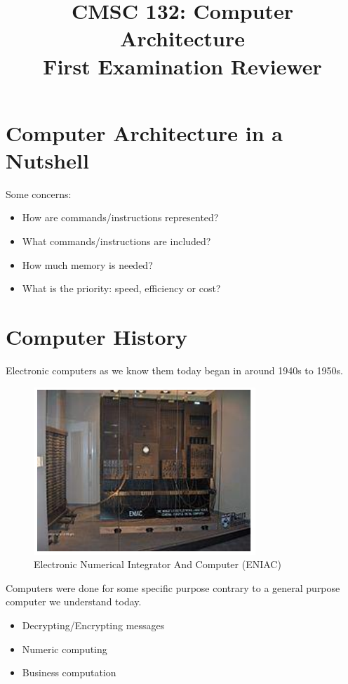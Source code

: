 \documentclass[9pt,twocolumn]{article}
\title{
  \textbf{CMSC 132: Computer Architecture} \\
  First Examination Reviewer
}
\date{}
\begin{document}
\maketitle

\section*{Computer Architecture in a Nutshell}
  Some concerns:
  \begin{itemize}
    \item How are commands/instructions represented?
    \item What commands/instructions are included?
    \item How much memory is needed?
    \item What is the priority: speed, efficiency or cost?
  \end{itemize}

\section*{Computer History}
  Electronic computers as we know them today began in around 1940s to 1950s.
  \begin{figure}[h]
    \centering
    \includegraphics[scale=0.75]{./assets/001/eniac.png}
    \caption{Electronic Numerical Integrator And Computer (ENIAC)}
  \end{figure}

  Computers were done for some specific purpose contrary to a general purpose computer we understand today.
  \begin{itemize}
    \item Decrypting/Encrypting messages
    \item Numeric computing
    \item Business computation
  \end{itemize}
  
\end{document}
